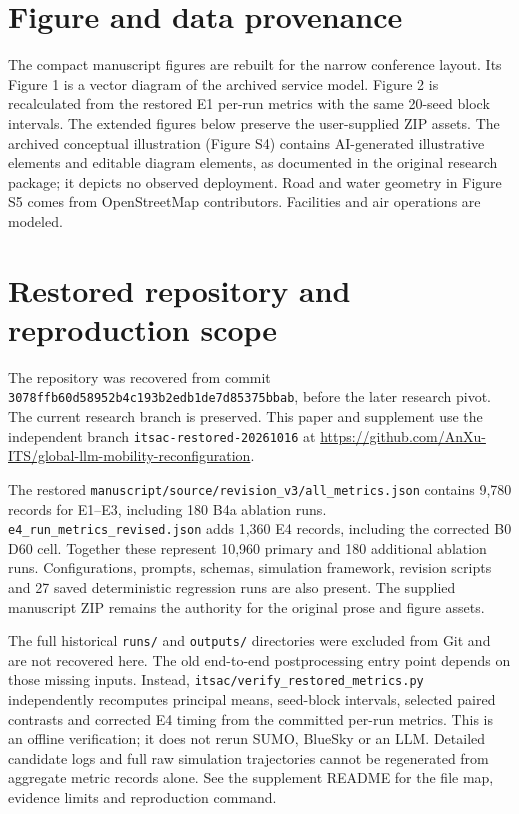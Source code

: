 \documentclass[11pt,a4paper]{article}
\begin{document}
\section{Figure and data provenance}
The compact manuscript figures are rebuilt for the narrow conference layout. Its Figure 1 is a vector diagram of the archived service model. Figure 2 is recalculated from the restored E1 per-run metrics with the same 20-seed block intervals. The extended figures below preserve the user-supplied ZIP assets. The archived conceptual illustration (Figure S4) contains AI-generated illustrative elements and editable diagram elements, as documented in the original research package; it depicts no observed deployment. Road and water geometry in Figure S5 comes from OpenStreetMap contributors. Facilities and air operations are modeled.

\section{Restored repository and reproduction scope}
The repository was recovered from commit \nolinkurl{3078ffb60d58952b4c193b2edb1de7d85375bbab}, before the later research pivot. The current research branch is preserved. This paper and supplement use the independent branch \nolinkurl{itsac-restored-20261016} at \url{https://github.com/AnXu-ITS/global-llm-mobility-reconfiguration}.

The restored \nolinkurl{manuscript/source/revision_v3/all_metrics.json} contains 9,780 records for E1--E3, including 180 B4a ablation runs. \nolinkurl{e4_run_metrics_revised.json} adds 1,360 E4 records, including the corrected B0 D60 cell. Together these represent 10,960 primary and 180 additional ablation runs. Configurations, prompts, schemas, simulation framework, revision scripts and 27 saved deterministic regression runs are also present. The supplied manuscript ZIP remains the authority for the original prose and figure assets.

The full historical \nolinkurl{runs/} and \nolinkurl{outputs/} directories were excluded from Git and are not recovered here. The old end-to-end postprocessing entry point depends on those missing inputs. Instead, \nolinkurl{itsac/verify_restored_metrics.py} independently recomputes principal means, seed-block intervals, selected paired contrasts and corrected E4 timing from the committed per-run metrics. This is an offline verification; it does not rerun SUMO, BlueSky or an LLM. Detailed candidate logs and full raw simulation trajectories cannot be regenerated from aggregate metric records alone. See the supplement README for the file map, evidence limits and reproduction command.
\end{document}
